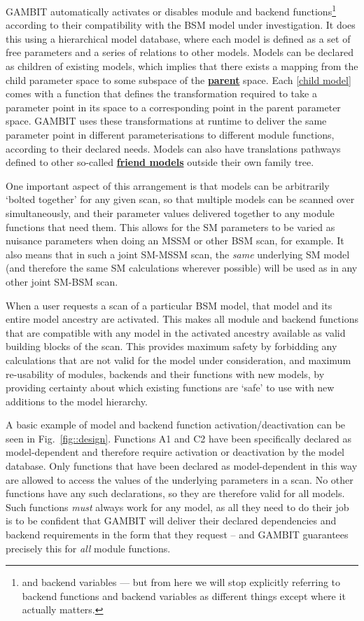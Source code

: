 \documentclass[pdftex,twocolumn,epjc3_preprint,runningheads]{svjour3}
\renewcommand{\_}{\discretionary{\underscore}{}{\underscore}}
\newcommand{\cross}[1]{\ref{#1}}
\newcommand{\doublecross}[2]{\hyperref[#2]{\textbf{#1}}}
\newcommand{\gambit}{\textsf{GAMBIT}\xspace}
\newcommand{\GB}{\gambit}
\begin{document}
\GB automatically activates or disables module and backend functions\footnote{and backend variables --- but from here we will stop explicitly referring to backend functions and backend variables as different things except where it actually matters.} according to their compatibility with the BSM model under investigation.  It does this using a hierarchical model database, where each model is defined as a set of free parameters and a series of relations to other models.  Models can be declared as children of existing models, which implies that there exists a mapping from the child parameter space to some subspace of the \doublecross{parent}{parent model} space.  Each \cross{child model} comes with a function that defines the transformation required to take a parameter point in its space to a corresponding point in the parent parameter space.  \GB uses these transformations at runtime to deliver the same parameter point in different parameterisations to different module functions, according to their declared needs.  Models can also have translations pathways defined to other so-called \doublecross{friend models}{friend model} outside their own family tree.

One important aspect of this arrangement is that models can be arbitrarily `bolted together' for any given scan, so that multiple models can be scanned over simultaneously, and their parameter values delivered together to any module functions that need them.  This allows for the SM parameters to be varied as nuisance parameters when doing an MSSM or other BSM scan, for example.  It also means that in such a joint SM-MSSM scan, the \textit{same} underlying SM model (and therefore the same SM calculations wherever possible) will be used as in any other joint SM-BSM scan.

When a user requests a scan of a particular BSM model, that model and its entire model ancestry are activated.  This makes all module and backend functions that are compatible with any model in the activated ancestry available as valid building blocks of the scan.  This provides maximum safety by forbidding any calculations that are not valid for the model under consideration, and maximum re-usability of modules, backends and their functions with new models, by providing certainty about which existing functions are `safe' to use with new additions to the model hierarchy.

A basic example of model and backend function activation/deactivation can be seen in Fig.\ \ref{fig::design}. Functions A1 and C2 have been specifically declared as model-dependent and therefore require activation or deactivation by the model database.  Only functions that have been declared as model-dependent in this way are allowed to access the values of the underlying parameters in a scan.  No other functions have any such declarations, so they are therefore valid for all models.  Such functions \textit{must} always work for any model, as all they need to do their job is to be confident that \GB will deliver their declared dependencies and backend requirements in the form that they request -- and \GB guarantees precisely this for \textit{all} module functions.
\end{document}
